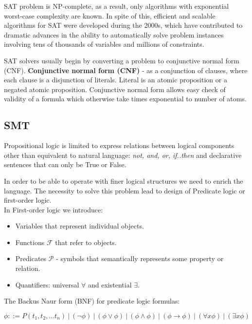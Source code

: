 SAT problem is NP-complete, as a result, only algorithms with exponential 
worst-case complexity are known. In spite of this, efficient and 
scalable algorithms for SAT were developed during the 2000s, which have 
contributed to dramatic advances in the ability to automatically 
solve problem instances involving tens of thousands of variables and 
millions of constraints.%

SAT solvers usually begin by converting a problem to conjunctive normal form (CNF).
\textbf{Conjunctive normal form (CNF)} - as a conjunction of clauses, where each clause is a disjunction of literals.
Literal is an atomic proposition or a negated atomic proposition.
Conjunctive normal form allows easy check of validity of a formula which otherwise take times exponential to number of atoms.




\subsection {SMT}
Propositional logic is limited to express relations between logical components other than equivalent to natural language: \emph{not, and, or, if..then} and 
declarative sentences that can only be True or False. 

In order to be able to operate with finer logical structures we need to enrich the language.
The necessity to solve this problem lead to design of Predicate logic or first-order logic.\\
In First-order logic we introduce:\\
\begin{itemize}
    
    \item Variables that represent individual objects.
    \item Functions $\mathcal{F}$ that refer to objects.
    \item Predicates $\mathcal{P}$ - symbols that semantically represents some property or relation.
    \item Quantifiers: universal $\forall$ and existential $\exists$.
\end{itemize}


The Backus Naur form (BNF) for predicate logic formulas:

\[ \phi ::= P(t_1,t_2,...t_n)\ |\ (\neg \phi)\ |\ (\phi \lor \phi)\  |\ (\phi \land \phi)\   |\ (\phi \rightarrow \phi)\ |\ (\forall x \phi)\ |\ (\exists x \phi)\ \]

